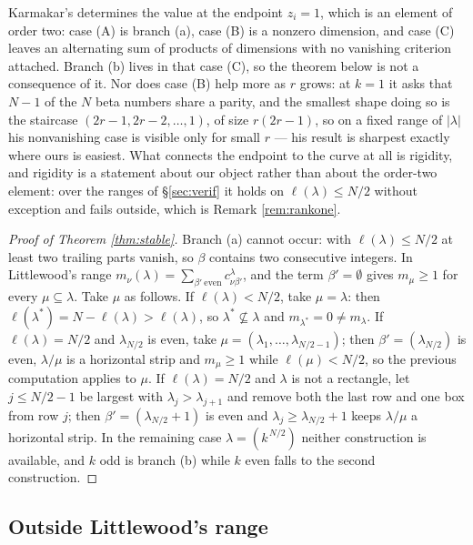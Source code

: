 \documentclass[11pt,reqno]{amsart}
\theoremstyle{plain}
\theoremstyle{definition}
\begin{document}
Karmakar's \cite[Theorem 4.1]{Kar24} determines the value at the endpoint $z_i=1$, which is an element
of order two: case (A) is branch (a), case (B) is a nonzero dimension, and case (C) leaves an
alternating sum of products of dimensions with no vanishing criterion attached. Branch (b) lives in
that case (C), so the theorem below is not a consequence of it. Nor does case (B) help more as $r$
grows: at $k=1$ it asks that $N-1$ of the $N$ beta numbers share a parity, and the smallest shape
doing so is the staircase $(2r-1,2r-2,\dots,1)$, of size $r(2r-1)$, so on a fixed range of
$|\lambda|$ his nonvanishing case is visible only for small $r$ --- his result is sharpest exactly
where ours is easiest. What connects the endpoint to the
curve at all is rigidity, and rigidity is a statement about our object rather than about the order-two
element: over the ranges of \S\ref{sec:verif} it holds on $\ell(\lambda)\le N/2$ without exception
and fails outside, which is Remark \ref{rem:rankone}.

\begin{proof}[Proof of Theorem \ref{thm:stable}]
Branch (a) cannot occur: with $\ell(\lambda)\le N/2$ at least two trailing parts vanish, so $\beta$
contains two consecutive integers. In Littlewood's range
$m_\nu(\lambda)=\sum_{\beta'\ \mathrm{even}}c^{\lambda}_{\nu\beta'}$, and the term $\beta'=\emptyset$
gives $m_\mu\ge1$ for every $\mu\subseteq\lambda$. Take $\mu$ as follows. If
$\ell(\lambda)<N/2$, take $\mu=\lambda$: then $\ell(\lambda^{*})=N-\ell(\lambda)>\ell(\lambda)$, so
$\lambda^{*}\not\subseteq\lambda$ and $m_{\lambda^{*}}=0\ne m_\lambda$. If $\ell(\lambda)=N/2$ and
$\lambda_{N/2}$ is even, take $\mu=(\lambda_1,\dots,\lambda_{N/2-1})$; then
$\beta'=(\lambda_{N/2})$ is even, $\lambda/\mu$ is a horizontal strip and $m_\mu\ge1$ while
$\ell(\mu)<N/2$, so the previous computation applies to $\mu$. If $\ell(\lambda)=N/2$ and $\lambda$
is not a rectangle, let $j\le N/2-1$ be largest with $\lambda_j>\lambda_{j+1}$ and remove both the
last row and one box from row $j$; then $\beta'=(\lambda_{N/2}+1)$ is even and
$\lambda_j\ge\lambda_{N/2}+1$ keeps $\lambda/\mu$ a horizontal strip. In the remaining case
$\lambda=(k^{\,N/2})$ neither construction is available, and $k$ odd is branch (b) while $k$ even
falls to the second construction.
\end{proof}

\subsection{Outside Littlewood's range}\label{sec:unstable}
\end{document}
